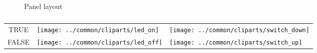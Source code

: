 \documentclass[a4paper]{report}
\author{hephaisto}
\title{\moduleTitle}
\begin{document}

\begin{figure}[t]
	\begin{center}
		\begin{tikzpicture}[scale=0.03,y=-1cm]
			
		\end{tikzpicture}
	\end{center}
	\caption{Panel layout}
	\label{fig:b_layout}
\end{figure}

\begin{table}
	\centering
	\begin{tabular}{|cm{1cm}m{1cm}|}\hline
		TRUE & \texttt{[image: ../common/cliparts/led\_on]} & \texttt{[image: ../common/cliparts/switch\_down]} \\
		FALSE & \texttt{[image: ../common/cliparts/led\_off]} & \texttt{[image: ../common/cliparts/switch\_up]} \\\hline
	\end{tabular}
	\caption{
	}
	\label{tab:b_io_logic}
\end{table}



\end{document}
